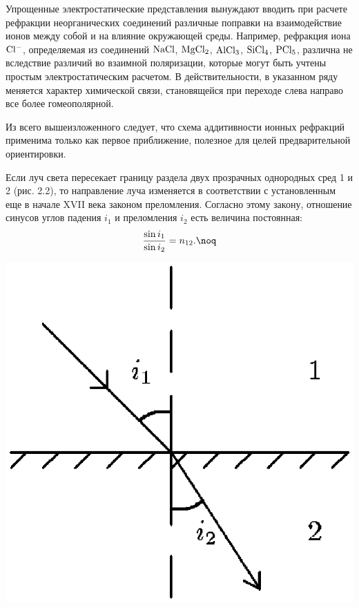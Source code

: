 Упрощенные электростатические представления вынуждают вводить при
расчете рефракции неорганических соединений различные поправки на
взаимодействие ионов между собой и на влияние окружающей среды.
Например, рефракция иона $\rm Cl^-$, определяемая из соединений
$\rm NaCl$, $\rm MgCl_2$, $\rm AlCl_3$, $\rm SiCl_4$, $\rm PCl_5$,
различна не вследствие различий во взаимной поляризации, которые
могут быть учтены простым электростатическим расчетом. В
действительности, в указанном ряду меняется характер химической
связи, становящейся при переходе слева направо все более
гомеополярной.

Из всего вышеизложенного следует, что схема аддитивности ионных
рефракций применима только как первое приближение, полезное для
целей предварительной ориентировки.

 \vskip 2mm Если луч света пересекает границу раздела двух
прозрачных однородных сред 1 и 2 (рис. 2.2), то направление луча
изменяется в соответствии с установленным еще в начале XVII века
законом преломления. Согласно этому закону, отношение синусов
углов падения $i_1$ и преломления $i_2$ есть величина постоянная:
$${\sin i_1\over\sin i_2}=n_{12}.\noq$$

\vskip 3mm
\centerline{\hbox{\includegraphics[scale=0.7]{Ris/ris_eps/ris2_02.eps}}}

